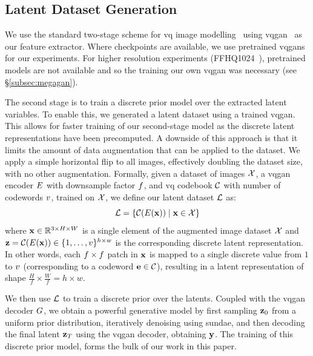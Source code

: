 \subsection{Latent Dataset Generation}
\label{subsec:datasetGen}

We use the standard two-stage scheme for \gls{vq} image
modelling~\cite{oord2018neural,razavi2019generating,esser2021taming,bondtaylor2021unleashing}
using \gls{vqgan}~\cite{esser2021taming} as our feature extractor. Where
checkpoints are available, we use pretrained \glspl{vqgan} for our experiments.
For higher resolution experiments (FFHQ1024~\cite{karras2019stylebased}),
pretrained models are not available and so the training our own \gls{vqgan} was
necessary (see \S\ref{subsec:megagan}). 

The second stage is to train a discrete prior model over the extracted latent variables.
To enable this, we generated a latent dataset using a trained \gls{vqgan}.
This allows for faster training of our second-stage model as the discrete latent
representations have been precomputed. A downside of this approach is that it
limits the amount of data augmentation that can be applied to the dataset. We
apply a simple horizontal flip to all images, effectively doubling the dataset
size, with no other augmentation. Formally, given a dataset of images
$\mathcal{X}$, a \gls{vqgan} encoder $E$ with downsample factor
$f$, and \gls{vq} codebook $\mathcal{C}$ with
number of codewords $v$, trained on $\mathcal{X}$, we define our
latent dataset $\mathcal{L}$ as:
\begin{equation}
    \mathcal{L} = \{\mathcal{C}(E(\mathbf{x})) \mid \mathbf{x} \in \mathcal{X} \}
\end{equation}
where $\mathbf{x} \in \mathbb{R}^{3 \times H \times W}$ is a single element of the
augmented image
dataset $\mathcal{X}$ and $\mathbf{z} = \mathcal{C}(E(\mathbf{x})) \in \{1, \dots,
v\}^{h \times w}$ is the corresponding discrete latent
representation. In other words, each $f \times f$
patch in $\mathbf{x}$ is mapped to a single discrete value from $1$ to
$v$ (corresponding to a codeword $\mathbf{e} \in
\mathcal{C}$),
resulting in a latent representation of shape $\frac{H}{f} \times \frac{W}{f} =
h \times w$.

We then use $\mathcal{L}$ to train a discrete prior over the latents. Coupled
with the \gls{vqgan} decoder $G$, we obtain a powerful generative
model by first sampling $\mathbf{z}_0$ from a uniform prior distribution,
iteratively denoising using \gls{sundae}, and then decoding the final latent
$\mathbf{z}_T$ using the \gls{vqgan} decoder, obtaining $\mathbf{y}$. The training
of this discrete prior model, forms the bulk of our work in this paper.

